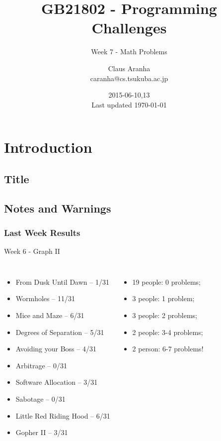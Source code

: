 \documentclass{beamer}
\title[GB21802]{GB21802 - Programming Challenges}
\subtitle[]{Week 7 - Math Problems}
\author[Claus Aranha]{Claus Aranha\\{\footnotesize caranha@cs.tsukuba.ac.jp}}
\institute{College of Information Science}
\date{2015-06-10,13\\{\tiny Last updated \today}}
\begin{document}
\section{Introduction}
\subsection{Title}
\begin{frame}
\maketitle
\end{frame}

\subsection{Notes and Warnings}

\begin{frame}
  \frametitle{Last Week Results}
  \begin{block}{Week 6 - Graph II}
    {\smaller
      \begin{columns}[T]
        \begin{itemize}
        \item From Dusk Until Dawn -- 1/31
        \item Wormholes -- 11/31
        \item Mice and Maze -- 6/31
        \item Degrees of Separation -- 5/31
        \item Avoiding your Boss -- 4/31
        \item Arbitrage -- 0/31
        \item Software Allocation -- 3/31
        \item Sabotage -- 0/31
        \item Little Red Riding Hood -- 6/31
        \item Gopher II -- 3/31
        \end{itemize}
        \begin{itemize}
        \item 19 people: 0 problems;
        \item 3 people: 1 problem;
        \item 3 people: 2 problems;
        \item 2 people: 3-4 problems;
        \item 2 person: 6-7 problems!
        \end{itemize}
      \end{columns}
    }
  \end{block}
\end{frame}
\end{document}

